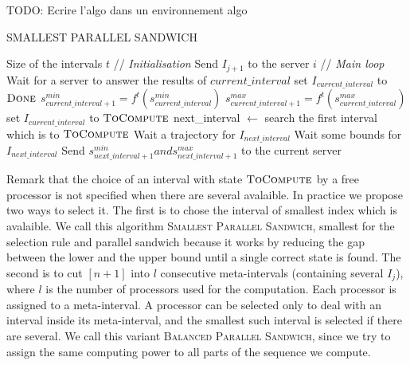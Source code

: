 \documentclass[a4paper,10pt]{article}
\newcommand{\todo}[1]{{\color{red} TODO: {#1}}}
\begin{document}
 \todo{Ecrire l'algo dans un environnement algo}
 	\begin{algorithm}[H]
 	\caption{SMALLEST PARALLEL SANDWICH}
 	\begin{algorithmic}
	\REQUIRE Size of the intervals $t$
 	\STATE // {\em Initialisation}
	\STATE Send $I_{j+1}$ to the server $i$
	\ENDFOR
	\STATE // {\em Main loop}
	\STATE Wait for a server to answer the results of $current\_interval$
	\STATE set $I_{current\_interval}$ to $\textsc{Done}$
	\ENDIF
	\STATE $s_{current\_interval+1}^{min} = f^t(s_{current\_interval}^{min})$
	\STATE $s_{current\_interval+1}^{max} = f^t(s_{current\_interval}^{max})$
	\STATE set $I_{current\_interval}$ to $\textsc{ToCompute}$
	\ENDIF
	\STATE next\_interval $\leftarrow$ search the first interval which is to  $\textsc{ToCompute}$
		\STATE Wait a trajectory for $I_{next\_interval}$
	\ELSE
		\STATE Wait some bounds for $I_{next\_interval}$
	\ENDIF	
		\STATE Send $s_{next\_interval+1}^{min} and s_{next\_interval+1}^{max}$ to the current server
	\ENDWHILE
 
 	\end{algorithmic}
 	\end{algorithm}
	


 
Remark that the choice of an interval with state $\textsc{ToCompute}$ by a free processor is not specified when there are several avalaible. In practice we propose two ways to select it. The first is to chose the interval of smallest index which is avalaible. We call this algorithm \textsc{Smallest Parallel Sandwich}, smallest for the selection rule and parallel sandwich because it works by 
reducing the gap between the lower and the upper bound until a single correct state is found. 
The second is to cut $[n+1]$ into $l$ consecutive meta-intervals (containing several $I_j$), where $l$ is the number of processors used for the computation. Each processor is assigned to a meta-interval. A processor can be selected only to deal with 
an interval inside its meta-interval, and the smallest such interval is selected if there are several. We call this variant 
 \textsc{Balanced Parallel Sandwich}, since we try to assign the same computing power to all parts of the sequence we compute. 
 
\end{document}
